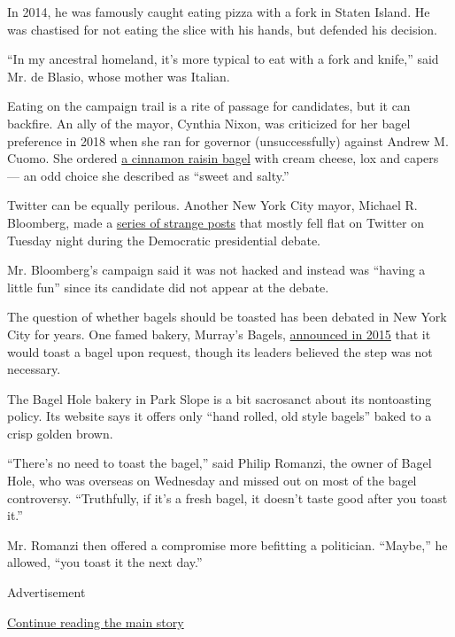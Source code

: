 In 2014, he was famously caught eating pizza with a fork in Staten
Island. He was chastised for not eating the slice with his hands, but
defended his decision.

``In my ancestral homeland, it's more typical to eat with a fork and
knife,'' said Mr. de Blasio, whose mother was Italian.

Eating on the campaign trail is a rite of passage for candidates, but it
can backfire. An ally of the mayor, Cynthia Nixon, was criticized for
her bagel preference in 2018 when she ran for governor (unsuccessfully)
against Andrew M. Cuomo. She ordered
\href{https://www.nytimes3xbfgragh.onion/2018/09/11/us/politics/on-politics-cynthia-nixon-interview.html}{a
cinnamon raisin bagel} with cream cheese, lox and capers --- an odd
choice she described as ``sweet and salty.''

Twitter can be equally perilous. Another New York City mayor, Michael R.
Bloomberg, made a
\href{https://nypost.com/2020/01/14/meatball-mike-bloomberg-has-a-weird-night-on-twitter-during-democratic-debate/}{series
of strange posts} that mostly fell flat on Twitter on Tuesday night
during the Democratic presidential debate.

Mr. Bloomberg's campaign said it was not hacked and instead was ``having
a little fun'' since its candidate did not appear at the debate.

The question of whether bagels should be toasted has been debated in New
York City for years. One famed bakery, Murray's Bagels,
\href{https://gothamist.com/food/the-traitors-at-murrays-will-now-toast-transplants-bagels}{announced
in 2015} that it would toast a bagel upon request, though its leaders
believed the step was not necessary.

The Bagel Hole bakery in Park Slope is a bit sacrosanct about its
nontoasting policy. Its website says it offers only ``hand rolled, old
style bagels'' baked to a crisp golden brown.

``There's no need to toast the bagel,'' said Philip Romanzi, the owner
of Bagel Hole, who was overseas on Wednesday and missed out on most of
the bagel controversy. ``Truthfully, if it's a fresh bagel, it doesn't
taste good after you toast it.''

Mr. Romanzi then offered a compromise more befitting a politician.
``Maybe,'' he allowed, ``you toast it the next day.''

Advertisement

\protect\hyperlink{after-bottom}{Continue reading the main story}

